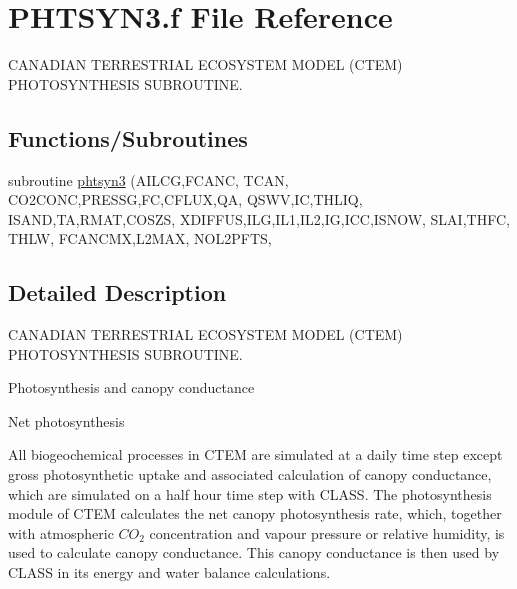 \hypertarget{PHTSYN3_8f}{}\section{P\+H\+T\+S\+Y\+N3.\+f File Reference}
\label{PHTSYN3_8f}


C\+A\+N\+A\+D\+I\+A\+N T\+E\+R\+R\+E\+S\+T\+R\+I\+A\+L E\+C\+O\+S\+Y\+S\+T\+E\+M M\+O\+D\+E\+L (C\+T\+E\+M) P\+H\+O\+T\+O\+S\+Y\+N\+T\+H\+E\+S\+I\+S S\+U\+B\+R\+O\+U\+T\+I\+N\+E.  


\subsection*{Functions/\+Subroutines}
\begin{DoxyCompactItemize}
\item 
subroutine \hyperlink{PHTSYN3_8f_a9d3d9bffc5e2ae5e7d6411e23328f59c}{phtsyn3} (A\+I\+L\+C\+G,F\+C\+A\+N\+C, T\+C\+A\+N, C\+O2\+C\+O\+N\+C,P\+R\+E\+S\+S\+G,F\+C,C\+F\+L\+U\+X,Q\+A, Q\+S\+W\+V,I\+C,T\+H\+L\+I\+Q, I\+S\+A\+N\+D,T\+A,R\+M\+A\+T,C\+O\+S\+Z\+S, X\+D\+I\+F\+F\+U\+S,I\+L\+G,I\+L1,I\+L2,I\+G,I\+C\+C,I\+S\+N\+O\+W, S\+L\+A\+I,T\+H\+F\+C, T\+H\+L\+W, F\+C\+A\+N\+C\+M\+X,L2\+M\+A\+X, N\+O\+L2\+P\+F\+T\+S,
\end{DoxyCompactItemize}


\subsection{Detailed Description}
C\+A\+N\+A\+D\+I\+A\+N T\+E\+R\+R\+E\+S\+T\+R\+I\+A\+L E\+C\+O\+S\+Y\+S\+T\+E\+M M\+O\+D\+E\+L (C\+T\+E\+M) P\+H\+O\+T\+O\+S\+Y\+N\+T\+H\+E\+S\+I\+S S\+U\+B\+R\+O\+U\+T\+I\+N\+E. 

Photosynthesis and canopy conductance

Net photosynthesis

All biogeochemical processes in C\+T\+E\+M are simulated at a daily time step except gross photosynthetic uptake and associated calculation of canopy conductance, which are simulated on a half hour time step with C\+L\+A\+S\+S. The photosynthesis module of C\+T\+E\+M calculates the net canopy photosynthesis rate, which, together with atmospheric $CO_2$ concentration and vapour pressure or relative humidity, is used to calculate canopy conductance. This canopy conductance is then used by C\+L\+A\+S\+S in its energy and water balance calculations.

